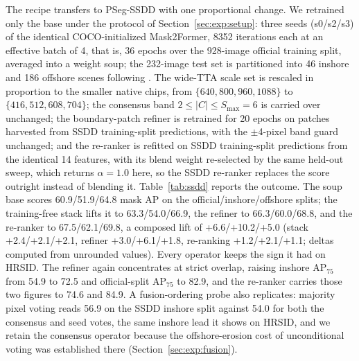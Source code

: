 The recipe transfers to PSeg-SSDD with one proportional change. We retrained only the base under the protocol of Section~\ref{sec:exp:setup}: three seeds (s0/s2/s3) of the identical COCO-initialized Mask2Former, 8352 iterations each at an effective batch of 4, that is, 36 epochs over the 928-image official training split, averaged into a weight soup; the 232-image test set is partitioned into 46 inshore and 186 offshore scenes following \cite{o2former2025}. The wide-TTA scale set is rescaled in proportion to the smaller native chips, from $\{640,800,960,1088\}$ to $\{416,512,608,704\}$; the consensus band $2\le|C|\le S_{\max}=6$ is carried over unchanged; the boundary-patch refiner is retrained for 20 epochs on patches harvested from SSDD training-split predictions, with the $\pm$4-pixel band guard unchanged; and the re-ranker is refitted on SSDD training-split predictions from the identical 14 features, with its blend weight re-selected by the same held-out sweep, which returns $\alpha=1.0$ here, so the SSDD re-ranker replaces the score outright instead of blending it. Table~\ref{tab:ssdd} reports the outcome. The soup base scores 60.9/51.9/64.8 mask AP on the official/inshore/offshore splits; the training-free stack lifts it to 63.3/54.0/66.9, the refiner to 66.3/60.0/68.8, and the re-ranker to 67.5/62.1/69.8, a composed lift of +6.6/+10.2/+5.0 (stack +2.4/+2.1/+2.1, refiner +3.0/+6.1/+1.8, re-ranking +1.2/+2.1/+1.1; deltas computed from unrounded values). Every operator keeps the sign it had on HRSID. The refiner again concentrates at strict overlap, raising inshore AP$_{75}$ from 54.9 to 72.5 and official-split AP$_{75}$ to 82.9, and the re-ranker carries those two figures to 74.6 and 84.9. A fusion-ordering probe also replicates: majority pixel voting reads 56.9 on the SSDD inshore split against 54.0 for both the consensus and seed votes, the same inshore lead it shows on HRSID, and we retain the consensus operator because the offshore-erosion cost of unconditional voting was established there (Section~\ref{sec:exp:fusion}).

